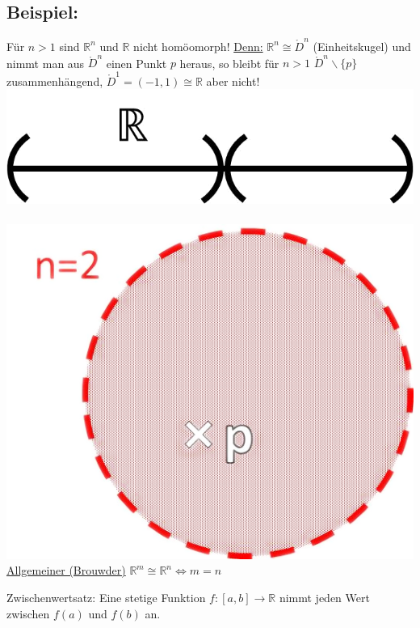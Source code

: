 \documentclass[a4paper,11pt,notitlepage]{report}
\theoremstyle{definition}
\newcommand{\R}{{\ensuremath{\mathbb{R}}}}
\newenvironment{bsp}[1]
{
\setlength{\fboxsep}{10pt}
\subsection*{Beispiel: #1}
\begin{upshape}
}
{
\end{upshape}
}
\begin{document}
\begin{bsp}{}
	Für $n > 1$ sind $\R^n$ und $\R$ nicht homöomorph!
	\newline
	\underline{Denn:} $\R^n \cong \mathring{D}^n$ (Einheitskugel) und nimmt man aus $\mathring{D}^n$ einen Punkt $p$ heraus, so bleibt für $n>1$ $\mathring{D}^n \backslash \{p\}$ zusammenhängend, $\mathring{D}^1 = (-1,1) \cong \R$ aber nicht!
	\newline
\includegraphics[scale=0.4]{images/R_ohne_p.png}$\qquad\qquad$
\includegraphics[scale=0.4]{images/R2_ohne_p.png}
	\newline
	\underline{Allgemeiner (Brouwder)} $\R^m \cong \R^n \Leftrightarrow m=n$
\end{bsp}

\begin{corollary}{Zwischenwertsatz:}
	Eine stetige Funktion $f \colon [a,b] \rightarrow \R$ nimmt jeden Wert zwischen $f(a)$ und $f(b)$ an.
\end{corollary}
\end{document}
